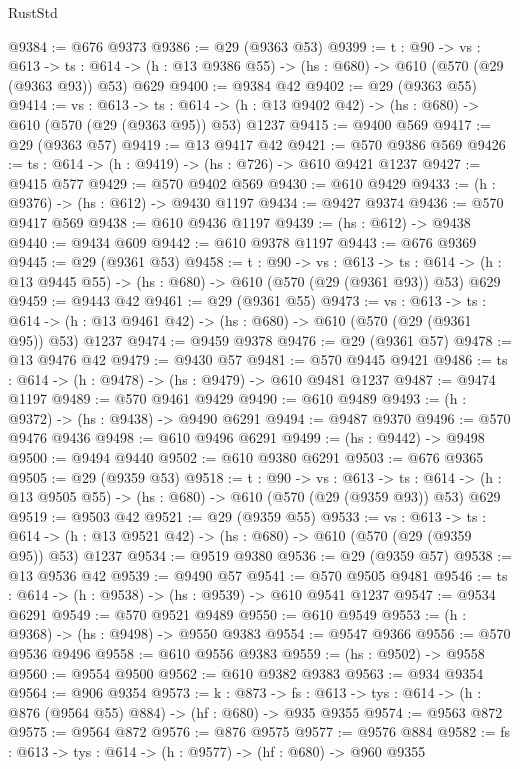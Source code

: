 \begin{lexlean}{RustStd}
\begin{coremodule}
@9384 := @676 @9373
@9386 := @29 (@9363 @53)
@9399 := {t : @90} ->
  {vs : @613} ->
  {ts : @614} -> (h : @13 @9386 @55) -> (hs : @680) -> @610 (@570 (@29 (@9363 @93)) @53) @629
@9400 := @9384 @42
@9402 := @29 (@9363 @55)
@9414 := {vs : @613} ->
  {ts : @614} -> (h : @13 @9402 @42) -> (hs : @680) -> @610 (@570 (@29 (@9363 @95)) @53) @1237
@9415 := @9400 @569
@9417 := @29 (@9363 @57)
@9419 := @13 @9417 @42
@9421 := @570 @9386 @569
@9426 := {ts : @614} -> (h : @9419) -> (hs : @726) -> @610 @9421 @1237
@9427 := @9415 @577
@9429 := @570 @9402 @569
@9430 := @610 @9429
@9433 := (h : @9376) -> (hs : @612) -> @9430 @1197
@9434 := @9427 @9374
@9436 := @570 @9417 @569
@9438 := @610 @9436 @1197
@9439 := (hs : @612) -> @9438
@9440 := @9434 @609
@9442 := @610 @9378 @1197
@9443 := @676 @9369
@9445 := @29 (@9361 @53)
@9458 := {t : @90} ->
  {vs : @613} ->
  {ts : @614} -> (h : @13 @9445 @55) -> (hs : @680) -> @610 (@570 (@29 (@9361 @93)) @53) @629
@9459 := @9443 @42
@9461 := @29 (@9361 @55)
@9473 := {vs : @613} ->
  {ts : @614} -> (h : @13 @9461 @42) -> (hs : @680) -> @610 (@570 (@29 (@9361 @95)) @53) @1237
@9474 := @9459 @9378
@9476 := @29 (@9361 @57)
@9478 := @13 @9476 @42
@9479 := @9430 @57
@9481 := @570 @9445 @9421
@9486 := {ts : @614} -> (h : @9478) -> (hs : @9479) -> @610 @9481 @1237
@9487 := @9474 @1197
@9489 := @570 @9461 @9429
@9490 := @610 @9489
@9493 := (h : @9372) -> (hs : @9438) -> @9490 @6291
@9494 := @9487 @9370
@9496 := @570 @9476 @9436
@9498 := @610 @9496 @6291
@9499 := (hs : @9442) -> @9498
@9500 := @9494 @9440
@9502 := @610 @9380 @6291
@9503 := @676 @9365
@9505 := @29 (@9359 @53)
@9518 := {t : @90} ->
  {vs : @613} ->
  {ts : @614} -> (h : @13 @9505 @55) -> (hs : @680) -> @610 (@570 (@29 (@9359 @93)) @53) @629
@9519 := @9503 @42
@9521 := @29 (@9359 @55)
@9533 := {vs : @613} ->
  {ts : @614} -> (h : @13 @9521 @42) -> (hs : @680) -> @610 (@570 (@29 (@9359 @95)) @53) @1237
@9534 := @9519 @9380
@9536 := @29 (@9359 @57)
@9538 := @13 @9536 @42
@9539 := @9490 @57
@9541 := @570 @9505 @9481
@9546 := {ts : @614} -> (h : @9538) -> (hs : @9539) -> @610 @9541 @1237
@9547 := @9534 @6291
@9549 := @570 @9521 @9489
@9550 := @610 @9549
@9553 := (h : @9368) -> (hs : @9498) -> @9550 @9383
@9554 := @9547 @9366
@9556 := @570 @9536 @9496
@9558 := @610 @9556 @9383
@9559 := (hs : @9502) -> @9558
@9560 := @9554 @9500
@9562 := @610 @9382 @9383
@9563 := @934 @9354
@9564 := @906 @9354
@9573 := {k : @873} ->
  {fs : @613} -> {tys : @614} -> (h : @876 (@9564 @55) @884) -> (hf : @680) -> @935 @9355
@9574 := @9563 @872
@9575 := @9564 @872
@9576 := @876 @9575
@9577 := @9576 @884
@9582 := {fs : @613} -> {tys : @614} -> (h : @9577) -> (hf : @680) -> @960 @9355

\end{coremodule}
\end{lexlean}
